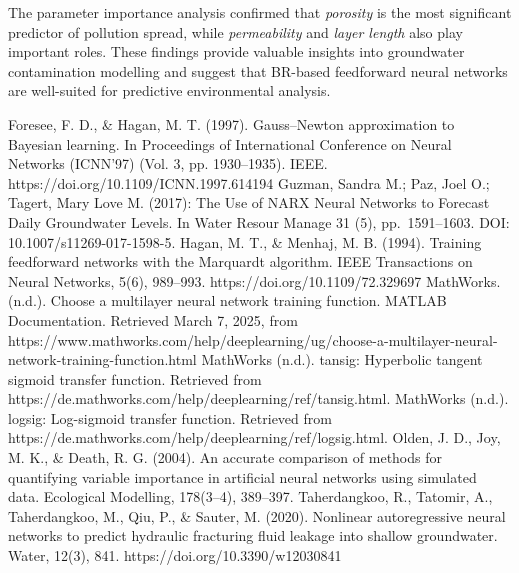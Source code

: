 \documentclass[10pt]{article}
\begin{document}
	The parameter importance analysis confirmed that \textit{porosity} is the most significant predictor of pollution spread, while \textit{permeability} and \textit{layer length} also play important roles. These findings provide valuable insights into groundwater contamination modelling and suggest that BR-based feedforward neural networks are well-suited for predictive environmental analysis.
	
	
	
	\begin{thebibliography}{99} %
		Foresee, F. D., \& Hagan, M. T. (1997). Gauss–Newton approximation to Bayesian learning. In Proceedings of International Conference on Neural Networks (ICNN’97) (Vol. 3, pp. 1930–1935). IEEE. https://doi.org/10.1109/ICNN.1997.614194
		Guzman, Sandra M.; Paz, Joel O.; Tagert, Mary Love M. (2017): The Use of NARX Neural Networks to Forecast Daily Groundwater Levels. In Water Resour Manage 31 (5), pp. 1591–1603. DOI: 10.1007/s11269-017-1598-5.
		Hagan, M. T., \& Menhaj, M. B. (1994). Training feedforward networks with the Marquardt algorithm. IEEE Transactions on Neural Networks, 5(6), 989–993. https://doi.org/10.1109/72.329697
		MathWorks. (n.d.). Choose a multilayer neural network training function. MATLAB Documentation. Retrieved March 7, 2025, from https://www.mathworks.com/help/deeplearning/ug/choose-a-multilayer-neural-network-training-function.html
		MathWorks (n.d.). tansig: Hyperbolic tangent sigmoid transfer function. Retrieved from https://de.mathworks.com/help/deeplearning/ref/tansig.html.
		MathWorks (n.d.). logsig: Log-sigmoid transfer function. Retrieved from https://de.mathworks.com/help/deeplearning/ref/logsig.html.
		Olden, J. D., Joy, M. K., \& Death, R. G. (2004). An accurate comparison of methods for quantifying variable importance in artificial neural networks using simulated data. Ecological Modelling, 178(3–4), 389–397.
		Taherdangkoo, R., Tatomir, A., Taherdangkoo, M., Qiu, P., \& Sauter, M. (2020). Nonlinear autoregressive neural networks to predict hydraulic fracturing fluid leakage into shallow groundwater. Water, 12(3), 841. https://doi.org/10.3390/w12030841
	\end{thebibliography}
	
\end{document}
